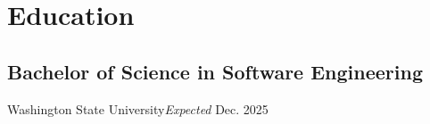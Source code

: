 \section{Education}
\subsection{Bachelor of Science in Software Engineering}{Washington State University}{\textit{Expected} Dec. 2025}

\vspace{0.2em}
